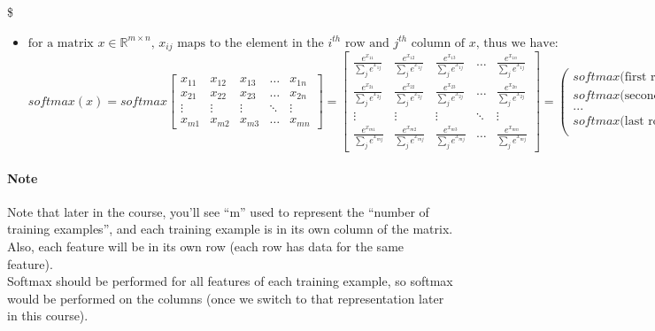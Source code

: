 \documentclass[11pt]{article}
\providecommand{\tightlist}{%
      \setlength{\itemsep}{0pt}\setlength{\parskip}{0pt}}
\begin{document}
\$

\begin{itemize}
\tightlist
\item
  \(\text{for a matrix } x \in \mathbb{R}^{m \times n} \text{,  $x_{ij}$ maps to the element in the $i^{th}$ row and $j^{th}$ column of $x$, thus we have: }\)
  \[softmax(x) = softmax\begin{bmatrix}
    x_{11} & x_{12} & x_{13} & \dots  & x_{1n} \\
    x_{21} & x_{22} & x_{23} & \dots  & x_{2n} \\
    \vdots & \vdots & \vdots & \ddots & \vdots \\
    x_{m1} & x_{m2} & x_{m3} & \dots  & x_{mn}
  \end{bmatrix} = \begin{bmatrix}
    \frac{e^{x_{11}}}{\sum_{j}e^{x_{1j}}} & \frac{e^{x_{12}}}{\sum_{j}e^{x_{1j}}} & \frac{e^{x_{13}}}{\sum_{j}e^{x_{1j}}} & \dots  & \frac{e^{x_{1n}}}{\sum_{j}e^{x_{1j}}} \\
    \frac{e^{x_{21}}}{\sum_{j}e^{x_{2j}}} & \frac{e^{x_{22}}}{\sum_{j}e^{x_{2j}}} & \frac{e^{x_{23}}}{\sum_{j}e^{x_{2j}}} & \dots  & \frac{e^{x_{2n}}}{\sum_{j}e^{x_{2j}}} \\
    \vdots & \vdots & \vdots & \ddots & \vdots \\
    \frac{e^{x_{m1}}}{\sum_{j}e^{x_{mj}}} & \frac{e^{x_{m2}}}{\sum_{j}e^{x_{mj}}} & \frac{e^{x_{m3}}}{\sum_{j}e^{x_{mj}}} & \dots  & \frac{e^{x_{mn}}}{\sum_{j}e^{x_{mj}}}
  \end{bmatrix} = \begin{pmatrix}
    softmax\text{(first row of x)}  \\
    softmax\text{(second row of x)} \\
    ...  \\
    softmax\text{(last row of x)} \\
  \end{pmatrix} \]
\end{itemize}

    \hypertarget{note}{%
\paragraph{Note}\label{note}}

Note that later in the course, you'll see ``m'' used to represent the
``number of training examples'', and each training example is in its own
column of the matrix.\\
Also, each feature will be in its own row (each row has data for the
same feature).\\
Softmax should be performed for all features of each training example,
so softmax would be performed on the columns (once we switch to that
representation later in this course).
\end{document}
